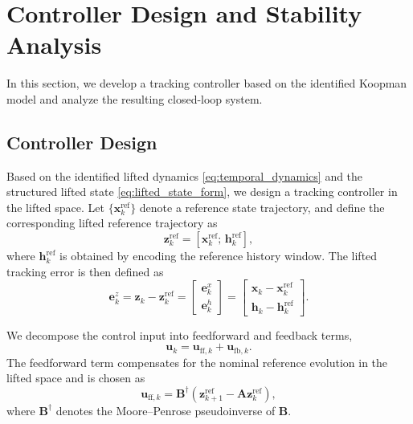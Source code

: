 \documentclass[journal]{IEEEtran}
\newcommand{\vx}{\mathbf{x}}
\newcommand{\vu}{\mathbf{u}}
\newcommand{\vz}{\mathbf{z}}
\newcommand{\vh}{\mathbf{h}}
\newcommand{\ve}{\mathbf{e}}
\newcommand{\mA}{\mathbf{A}}
\newcommand{\mB}{\mathbf{B}}
\begin{document}
\section{Controller Design and Stability Analysis}
\label{sec:control}

In this section, we develop a tracking controller based on the identified Koopman model and analyze the resulting closed-loop system.

\subsection{Controller Design}
\label{subsec:controller_design}

Based on the identified lifted dynamics \eqref{eq:temporal_dynamics} and the structured lifted state \eqref{eq:lifted_state_form}, we design a tracking controller in the lifted space. Let $\{\vx_k^{\mathrm{ref}}\}$ denote a reference state trajectory, and define the corresponding lifted reference trajectory as
\begin{equation}
    \vz_k^{\mathrm{ref}} = [\vx_k^{\mathrm{ref}};\,\vh_k^{\mathrm{ref}}],
    \label{eq:lifted_reference}
\end{equation}
where $\vh_k^{\mathrm{ref}}$ is obtained by encoding the reference history window. The lifted tracking error is then defined as
\begin{equation}
    \ve_k^z = \vz_k - \vz_k^{\mathrm{ref}}
    =
    \begin{bmatrix}
        \ve_k^x \\ \ve_k^h
    \end{bmatrix}
    =
    \begin{bmatrix}
        \vx_k - \vx_k^{\mathrm{ref}} \\
        \vh_k - \vh_k^{\mathrm{ref}}
    \end{bmatrix}.
    \label{eq:structured_error}
\end{equation}

We decompose the control input into feedforward and feedback terms,
\begin{equation}
    \vu_k = \vu_{\mathrm{ff},k} + \vu_{\mathrm{fb},k}.
    \label{eq:control_decomposition}
\end{equation}
The feedforward term compensates for the nominal reference evolution in the lifted space and is chosen as
\begin{equation}
    \vu_{\mathrm{ff},k}
    =
    \mB^\dagger \!\left(\vz_{k+1}^{\mathrm{ref}} - \mA \vz_k^{\mathrm{ref}}\right),
    \label{eq:feedforward}
\end{equation}
where $\mB^\dagger$ denotes the Moore--Penrose pseudoinverse of $\mB$.
\end{document}
